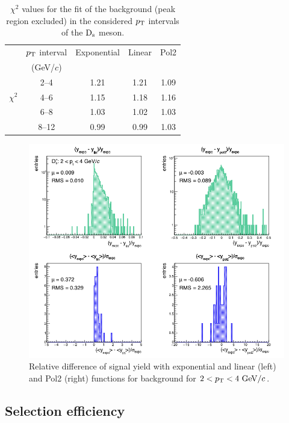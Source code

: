 \begin{table}[!t]
\centering
\vspace{0.5cm}
\begin{tabular}{|c|c|c|c|c|} 
\hline \rule{0pt}{2.7ex}
 & $p_{\rm T}$ interval & Exponential & Linear & Pol2 \\ 
 &(GeV/$c$) & & &  \\ 
\hline \rule{0pt}{2.7ex}
           &\phantom{0}2--4\phantom{0} & 1.21 & 1.21 & 1.09\\
           $\chi^2$ &\phantom{0}4--6\phantom{0} & 1.15 & 1.18 & 1.16\\
          &\phantom{0}6--8\phantom{0} & 1.03 & 1.02 & 1.03\\
           &\phantom{0}8--12 & 0.99 & 0.99  & 1.03\\
\hline

\end{tabular}
\caption{$\chi^2$ values for the fit of the background (peak region excluded) in the
considered $p_{\rm T}$ intervals of the ${\rm D_s}$ meson.} 
\label{tab:chi2bkg}
\end{table}

\begin{figure}[!htb]
\begin{center}
 \includegraphics[width=.70\textwidth]{FigCap4/studyBkg_Free_pt0.png}
\caption{Relative difference of signal yield with exponential and linear (left) and Pol2 (right) 
functions for background for $2 < p_{\rm T} < 4 ~\mathrm{GeV}/c$.}             
\label{fig:diffBkgPt0}
\end{center}
\end{figure}


\subsection{Selection efficiency}

